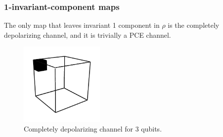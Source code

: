\documentclass[11pt,dvipsnames]{article} %
\newcommand{\1}{\mathds{1}}
\begin{document}
\subsubsection*{1-invariant-component maps} %
The only map that leaves invariant 1 component in $\rho$ is the completely
depolarizing channel, and it is trivially a PCE channel.
\begin{figure}[H]
	\includegraphics[height=4cm]{img/3q-1c}
	\caption{Completely depolarizing channel for 3 qubits.}
	\label{fig:QC-3q-1c}
\end{figure}
\end{document}
